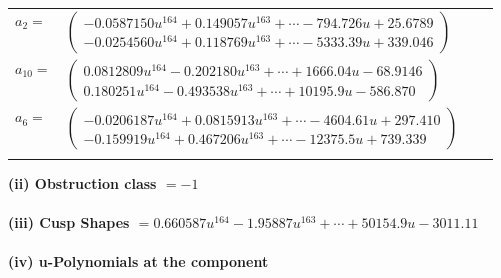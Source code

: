 \documentclass[1p]{elsarticle_modified}
\theoremstyle{definition}
\begin{document}
\begin{tabular}{m{7pt} m{180pt} m{7pt} m{180pt} }
\flushright $a_{2}=$&$\begin{pmatrix}-0.0587150 u^{164}+0.149057 u^{163}+\cdots-794.726 u+25.6789\\-0.0254560 u^{164}+0.118769 u^{163}+\cdots-5333.39 u+339.046\end{pmatrix}$ \\
\flushright $a_{10}=$&$\begin{pmatrix}0.0812809 u^{164}-0.202180 u^{163}+\cdots+1666.04 u-68.9146\\0.180251 u^{164}-0.493538 u^{163}+\cdots+10195.9 u-586.870\end{pmatrix}$ \\
\flushright $a_{6}=$&$\begin{pmatrix}-0.0206187 u^{164}+0.0815913 u^{163}+\cdots-4604.61 u+297.410\\-0.159919 u^{164}+0.467206 u^{163}+\cdots-12375.5 u+739.339\end{pmatrix}$\\&\end{tabular}
\flushleft \textbf{(ii) Obstruction class $= -1$}\\~\\
\flushleft \textbf{(iii) Cusp Shapes $= 0.660587 u^{164}-1.95887 u^{163}+\cdots+50154.9 u-3011.11$}\\~\\
\newpage\renewcommand{\arraystretch}{1}
\flushleft \textbf{(iv) u-Polynomials at the component}\newline \\
\end{document}

